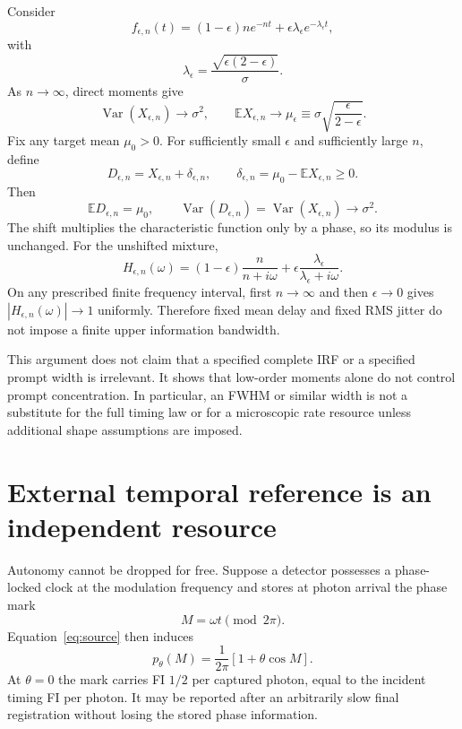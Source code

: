 \documentclass[aps,prapplied,preprint,nofootinbib]{revtex4-2}
\begin{document}
Consider
\begin{equation}
f_{\epsilon,n}(t)
=(1-\epsilon)ne^{-nt}
+\epsilon\lambda_\epsilon e^{-\lambda_\epsilon t},
\end{equation}
with
\begin{equation}
\lambda_\epsilon=\frac{\sqrt{\epsilon(2-\epsilon)}}{\sigma}.
\end{equation}
As $n\to\infty$, direct moments give
\begin{equation}
\operatorname{Var}(X_{\epsilon,n})\to\sigma^2,
\qquad
\mathbb E X_{\epsilon,n}\to
\mu_\epsilon\equiv\sigma\sqrt{\frac{\epsilon}{2-\epsilon}}.
\end{equation}
Fix any target mean $\mu_0>0$. For sufficiently small $\epsilon$ and sufficiently large $n$, define
\begin{equation}
D_{\epsilon,n}=X_{\epsilon,n}+\delta_{\epsilon,n},
\qquad
\delta_{\epsilon,n}=\mu_0-\mathbb E X_{\epsilon,n}\ge0.
\end{equation}
Then
\begin{equation}
\mathbb E D_{\epsilon,n}=\mu_0,
\qquad
\operatorname{Var}(D_{\epsilon,n})=\operatorname{Var}(X_{\epsilon,n})\to\sigma^2.
\end{equation}
The shift multiplies the characteristic function only by a phase, so its modulus is unchanged. For the unshifted mixture,
\begin{equation}
H_{\epsilon,n}(\omega)
=(1-\epsilon)\frac{n}{n+i\omega}
+\epsilon\frac{\lambda_\epsilon}{\lambda_\epsilon+i\omega}.
\end{equation}
On any prescribed finite frequency interval, first $n\to\infty$ and then $\epsilon\to0$ gives $|H_{\epsilon,n}(\omega)|\to1$ uniformly. Therefore fixed mean delay and fixed RMS jitter do not impose a finite upper information bandwidth.

This argument does not claim that a specified complete IRF or a specified prompt width is irrelevant. It shows that low-order moments alone do not control prompt concentration. In particular, an FWHM or similar width is not a substitute for the full timing law or for a microscopic rate resource unless additional shape assumptions are imposed.

\section{External temporal reference is an independent resource}
\label{sec:clock}

Autonomy cannot be dropped for free. Suppose a detector possesses a phase-locked clock at the modulation frequency and stores at photon arrival the phase mark
\begin{equation}
M=\omega t\pmod{2\pi}.
\end{equation}
Equation~\eqref{eq:source} then induces
\begin{equation}
p_\theta(M)=\frac{1}{2\pi}[1+\theta\cos M].
\end{equation}
At $\theta=0$ the mark carries FI $1/2$ per captured photon, equal to the incident timing FI per photon. It may be reported after an arbitrarily slow final registration without losing the stored phase information.
\end{document}
